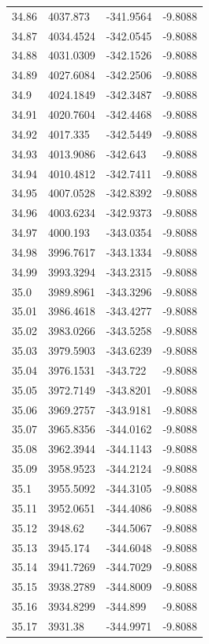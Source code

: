 \begin{table}[H]
\begin{tabular}{llll}
34.86 & 4037.873 & -341.9564 & -9.8088 \\
34.87 & 4034.4524 & -342.0545 & -9.8088 \\
34.88 & 4031.0309 & -342.1526 & -9.8088 \\
34.89 & 4027.6084 & -342.2506 & -9.8088 \\
34.9 & 4024.1849 & -342.3487 & -9.8088 \\
34.91 & 4020.7604 & -342.4468 & -9.8088 \\
34.92 & 4017.335 & -342.5449 & -9.8088 \\
34.93 & 4013.9086 & -342.643 & -9.8088 \\
34.94 & 4010.4812 & -342.7411 & -9.8088 \\
34.95 & 4007.0528 & -342.8392 & -9.8088 \\
34.96 & 4003.6234 & -342.9373 & -9.8088 \\
34.97 & 4000.193 & -343.0354 & -9.8088 \\
34.98 & 3996.7617 & -343.1334 & -9.8088 \\
34.99 & 3993.3294 & -343.2315 & -9.8088 \\
35.0 & 3989.8961 & -343.3296 & -9.8088 \\
35.01 & 3986.4618 & -343.4277 & -9.8088 \\
35.02 & 3983.0266 & -343.5258 & -9.8088 \\
35.03 & 3979.5903 & -343.6239 & -9.8088 \\
35.04 & 3976.1531 & -343.722 & -9.8088 \\
35.05 & 3972.7149 & -343.8201 & -9.8088 \\
35.06 & 3969.2757 & -343.9181 & -9.8088 \\
35.07 & 3965.8356 & -344.0162 & -9.8088 \\
35.08 & 3962.3944 & -344.1143 & -9.8088 \\
35.09 & 3958.9523 & -344.2124 & -9.8088 \\
35.1 & 3955.5092 & -344.3105 & -9.8088 \\
35.11 & 3952.0651 & -344.4086 & -9.8088 \\
35.12 & 3948.62 & -344.5067 & -9.8088 \\
35.13 & 3945.174 & -344.6048 & -9.8088 \\
35.14 & 3941.7269 & -344.7029 & -9.8088 \\
35.15 & 3938.2789 & -344.8009 & -9.8088 \\
35.16 & 3934.8299 & -344.899 & -9.8088 \\
35.17 & 3931.38 & -344.9971 & -9.8088 \\

\end{tabular}
\end{table}
